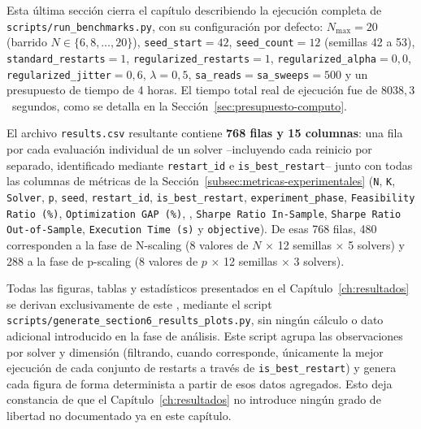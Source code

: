 Esta última sección cierra el capítulo describiendo la ejecución completa de \texttt{scripts/run\_benchmarks.py}, con su configuración por defecto: $N_{\max}=20$ (barrido $N \in \{6,8,\dots,20\}$), \texttt{seed\_start}$=42$, \texttt{seed\_count}$=12$ (semillas 42 a 53), \texttt{standard\_restarts}$=1$, \texttt{regularized\_restarts}$=1$, \texttt{regularized\_alpha}$=0{,}0$, \texttt{regularized\_jitter}$=0{,}6$, $\lambda=0{,}5$, \texttt{sa\_reads}$=$\texttt{sa\_sweeps}$=500$ y un presupuesto de tiempo de 4 horas. El tiempo total real de ejecución fue de $8038{,}3$~segundos, como se detalla en la Sección~\ref{sec:presupuesto-computo}.

El archivo \texttt{results.csv} resultante contiene \textbf{768 filas y 15 columnas}: una fila por cada evaluación individual de un solver --incluyendo cada reinicio por separado, identificado mediante \texttt{restart\_id} e \texttt{is\_best\_restart}-- junto con todas las columnas de métricas de la Sección~\ref{subsec:metricas-experimentales} (\texttt{N}, \texttt{K}, \texttt{Solver}, \texttt{p}, \texttt{seed}, \texttt{restart\_id}, \texttt{is\_best\_restart}, \texttt{experiment\_phase}, \texttt{Feasibility Ratio (\%)}, \texttt{Optimization GAP (\%)}, \texttt{}, \texttt{Sharpe Ratio In-Sample}, \texttt{Sharpe Ratio Out-of-Sample}, \texttt{Execution Time (s)} y \texttt{objective}). De esas 768 filas, 480 corresponden a la fase de N-scaling (8 valores de $N$ $\times$ 12 semillas $\times$ 5 solvers) y 288 a la fase de p-scaling (8 valores de $p$ $\times$ 12 semillas $\times$ 3 solvers).

Todas las figuras, tablas y estadísticos presentados en el Capítulo~\ref{ch:resultados} se derivan exclusivamente de este \texttt{}, mediante el script \texttt{scripts/generate\_section6\_results\_plots.py}, sin ningún cálculo o dato adicional introducido en la fase de análisis. Este script agrupa las observaciones por solver y dimensión (filtrando, cuando corresponde, únicamente la mejor ejecución de cada conjunto de restarts a través de \texttt{is\_best\_restart}) y genera cada figura de forma determinista a partir de esos datos agregados. Esto deja constancia de que el Capítulo~\ref{ch:resultados} no introduce ningún grado de libertad no documentado ya en este capítulo.
